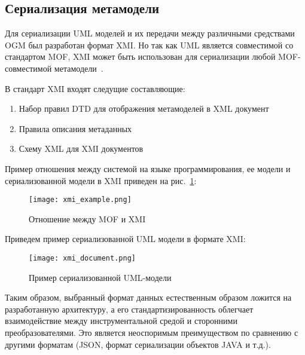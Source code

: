 \subsection{Сериализация метамодели}


Для сериализации UML моделей и их передачи между различными средствами OGM был
разработан формат XMI. Но так как UML является совместимой со стандартом MOF,
XMI может быть использован для сериализации любой MOF-совместимой
метамодели~\cite{standard/XMI}.

В стандарт XMI входят следущие составляющие:

\begin{enumerate}
    \item Набор правил DTD для отображения метамоделей в XML документ
    \item Правила описания метаданных
    \item Схему XML для XMI документов
\end{enumerate}

Пример отношения между системой на языке программирования, ее модели и сериализованной
модели в XMI приведен на рис.~\ref{fig:xmi_example}:

\begin{figure}[h]
    \begin{center}
        \texttt{[image: xmi\_example.png]}
    \end{center}
    \caption{Отношение между MOF и XMI}
    \label{fig:xmi_example}
\end{figure}

Приведем пример сериализованной UML модели в формате XMI:

\begin{figure}[h]
    \begin{center}
        \texttt{[image: xmi\_document.png]}
    \end{center}
    \caption{Пример сериализованной UML-модели}
    \label{fig:xmi_document}
\end{figure}

Таким образом, выбранный формат данных естественным образом ложится на
разработанную архитектуру, а его стандартизированность облегчает взаимодействие
между инструментальной средой и сторонними преобразователями. Это является
неоспоримым преимуществом по сравнению с другими форматам (JSON, формат
сериализации объектов JAVA и т.д.).

